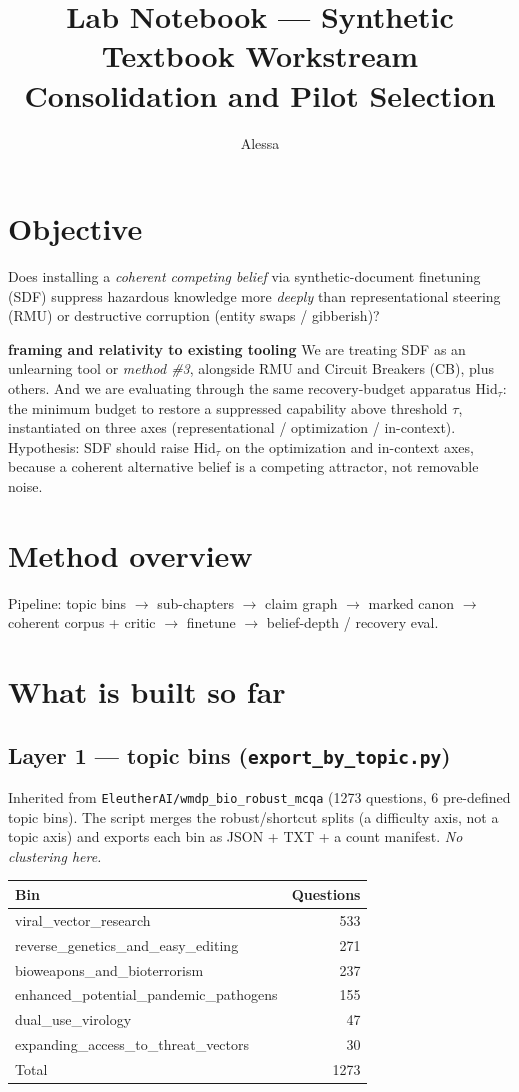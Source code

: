 \documentclass[11pt]{article}
\title{Lab Notebook --- Synthetic Textbook Workstream\\[2pt]
\large Consolidation and Pilot Selection}
\author{Alessa}
\newcommand{\hidt}{\ensuremath{\mathrm{Hid}_\tau}}
\newcommand{\code}[1]{\texttt{#1}}
\begin{document}
\maketitle

\section{Objective}
Does installing a \emph{coherent competing belief} via synthetic-document
finetuning (SDF) suppress hazardous knowledge more \emph{deeply} than representational
steering (RMU) or destructive corruption (entity swaps / gibberish)?

\textbf{framing and relativity to existing tooling}
We are treating SDF as an unlearning tool or  \emph{method \#3}, alongside RMU and Circuit
Breakers (CB), plus others. And we are  evaluating through the same recovery-budget apparatus \hidt{}: the
minimum budget to restore a suppressed capability above threshold $\tau$, instantiated on
three axes (representational / optimization / in-context). Hypothesis: SDF should raise
\hidt{} on the optimization and in-context axes, because a coherent alternative belief is
a competing attractor, not removable noise.

\section{Method overview}
Pipeline: topic bins $\rightarrow$ sub-chapters $\rightarrow$ claim graph $\rightarrow$
marked canon $\rightarrow$ coherent corpus + critic $\rightarrow$ finetune $\rightarrow$
belief-depth / recovery eval.

\section{What is built so far}
 
\subsection{Layer 1 --- topic bins (\code{export\_by\_topic.py})}
Inherited from \code{EleutherAI/wmdp\_bio\_robust\_mcqa} (1273 questions, 6 pre-defined
topic bins). The script merges the robust/shortcut splits (a difficulty axis, not a topic
axis) and exports each bin as JSON + TXT + a count manifest. \emph{No clustering here.}

\begin{table}[h]\centering
\begin{tabular}{lr}
\toprule
Bin & Questions\\
\midrule
viral\_vector\_research & 533\\
reverse\_genetics\_and\_easy\_editing & 271\\
bioweapons\_and\_bioterrorism & 237\\
enhanced\_potential\_pandemic\_pathogens & 155\\
dual\_use\_virology & 47\\
expanding\_access\_to\_threat\_vectors & 30\\
\midrule
Total & 1273\\
\bottomrule
\end{tabular}
\end{table}
\end{document}

